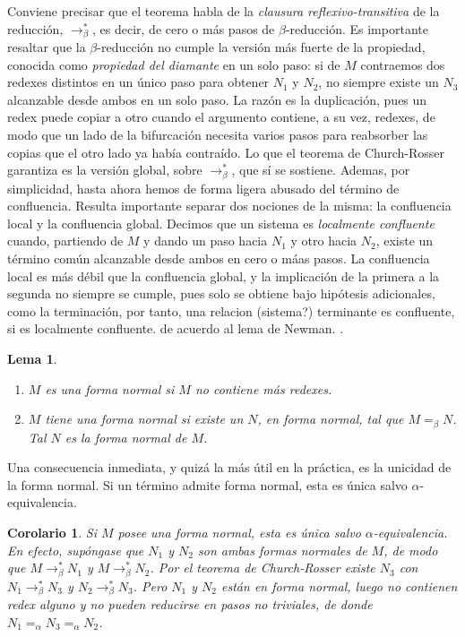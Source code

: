 \documentclass[a4paper,12pt]{report}
\theoremstyle{definition}
\theoremstyle{plain}
\newtheorem{lemma}[theorem]{Lema}
\newtheorem{corollary}[theorem]{Corolario}
\theoremstyle{remark}
\begin{document}
Conviene precisar que el teorema habla de la \textit{clausura reflexivo-transitiva} de la reducción, $\to_\beta^{\ast}$, es decir, de cero o más pasos de $\beta$-reducción. Es importante resaltar que la $\beta$-reducción no cumple la versión más fuerte de la propiedad, conocida como \textit{propiedad del diamante} en un solo paso: si de $M$ contraemos dos redexes distintos en un único paso para obtener $N_1$ y $N_2$, no siempre existe un $N_3$ alcanzable desde ambos en un solo paso. La razón es la duplicación, pues un redex puede copiar a otro cuando el argumento contiene, a su vez, redexes, de modo que un lado de la bifurcación necesita varios pasos para reabsorber las copias que el otro lado ya había contraído. Lo que el teorema de Church-Rosser garantiza es la versión global, sobre $\to_\beta^{\ast}$, que sí se sostiene.
\newline
\newline
Ademas, por simplicidad, hasta ahora hemos de forma ligera abusado del término de confluencia. Resulta importante separar dos nociones de la misma: la confluencia local y la confluencia global. Decimos que un sistema es \textit{localmente confluente} cuando, partiendo de $M$ y dando un paso hacia $N_1$ y otro hacia $N_2$, existe un término común alcanzable desde ambos en cero o máas pasos. La confluencia local es más débil que la confluencia global, y la implicación de la primera a la segunda no siempre se cumple, pues solo se obtiene bajo hipótesis adicionales, como la terminación, por tanto, una relacion (sistema?) terminante es confluente, si es localmente confluente. de acuerdo al lema de Newman. \citep{traat, barendregt1984}. 
\newline
\begin{lemma}
  \begin{enumerate}
    \item $M$ es una forma normal si $M$ no contiene más redexes.
    \item $M$ tiene una forma normal si existe un $N$, en forma normal, tal que $M =_\beta N$. Tal $N$ es la forma normal de $M$.
\end{enumerate}
\end{lemma}

Una consecuencia inmediata, y quizá la más útil en la práctica, es la unicidad de la forma normal. Si un término admite forma normal, esta es única salvo $\alpha$-equivalencia.

\begin{corollary}
  Si $M$ posee una forma normal, esta es única salvo $\alpha$-equivalencia. En efecto, supóngase que $N_1$ y $N_2$ son ambas formas normales de $M$, de modo que $M\to_\beta^{\ast}N_1$ y $M\to_\beta^{\ast}N_2$. Por el teorema de Church-Rosser existe $N_3$ con $N_1\to_\beta^{\ast}N_3$ y $N_2\to_\beta^{\ast}N_3$. Pero $N_1$ y $N_2$ están en forma normal, luego no contienen redex alguno y no pueden reducirse en pasos no triviales, de donde $N_1 =_\alpha N_3 =_\alpha N_2$.
\end{corollary}
\end{document}
